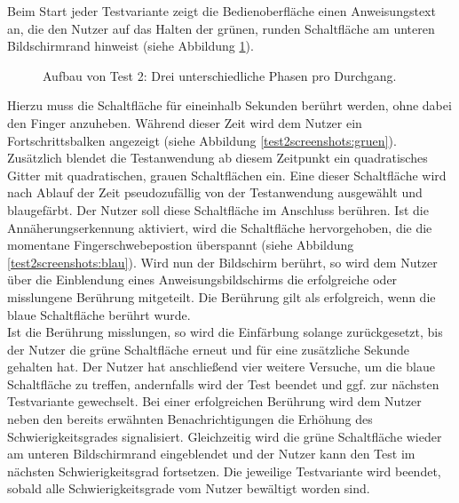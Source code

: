 \documentclass[12pt,numbers=noenddot,parskip,bibliography=totocnumbered,listof=totocnumbered]{scrreprt}
\begin{document}
Beim Start jeder Testvariante zeigt die Bedienoberfläche einen Anweisungstext an, die den Nutzer auf das Halten der grünen, runden Schaltfläche am unteren Bildschirmrand hinweist (siehe Abbildung \ref{test2phasen}).
\begin{figure}
\centering
{}
\vfill
{}
\vfill
{}
\caption{Aufbau von Test 2: Drei unterschiedliche Phasen pro Durchgang.}
\label{test2phasen}
\end{figure}
Hierzu muss die Schaltfläche für eineinhalb Sekunden berührt werden, ohne dabei den Finger anzuheben. Während dieser Zeit wird dem Nutzer ein Fortschrittsbalken angezeigt (siehe Abbildung \ref{test2screenshots:gruen}). Zusätzlich blendet die Testanwendung ab diesem Zeitpunkt ein quadratisches Gitter mit quadratischen, grauen Schaltflächen ein. Eine dieser Schaltfläche wird nach Ablauf der Zeit pseudozufällig von der Testanwendung ausgewählt und blaugefärbt. Der Nutzer soll diese Schaltfläche im Anschluss berühren. Ist die Annäherungserkennung aktiviert, wird die Schaltfläche hervorgehoben, die die momentane Fingerschwebepostion überspannt (siehe Abbildung \ref{test2screenshots:blau}). Wird nun der Bildschirm berührt, so wird dem Nutzer über die Einblendung eines Anweisungsbildschirms die erfolgreiche oder misslungene Berührung mitgeteilt. Die Berührung gilt als erfolgreich, wenn die blaue Schaltfläche berührt wurde.\\
Ist die Berührung misslungen, so wird die Einfärbung solange zurückgesetzt, bis der Nutzer die grüne Schaltfläche erneut und für eine zusätzliche Sekunde gehalten hat. Der Nutzer hat anschließend vier weitere Versuche, um die blaue Schaltfläche zu treffen, andernfalls wird der Test beendet und ggf. zur nächsten Testvariante gewechselt. Bei einer erfolgreichen Berührung wird dem Nutzer neben den bereits erwähnten Benachrichtigungen die Erhöhung des Schwierigkeitsgrades signalisiert. Gleichzeitig wird die grüne Schaltfläche wieder am unteren Bildschirmrand eingeblendet und der Nutzer kann den Test im nächsten Schwierigkeitsgrad fortsetzen. Die jeweilige Testvariante wird beendet, sobald alle Schwierigkeitsgrade vom Nutzer bewältigt worden sind.
\end{document}
